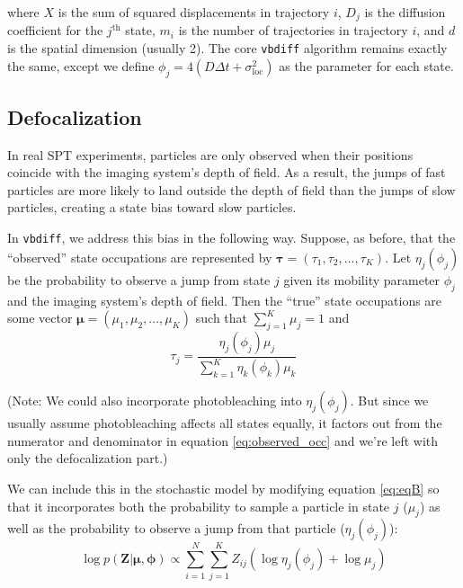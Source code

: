 \documentclass{article}
\let\vec\boldsymbol
\begin{document}
where $X$ is the sum of squared displacements in trajectory $i$,
$D_{j}$ is the diffusion coefficient for the $j^{\text{th}}$ state,
$m_{i}$ is the number of trajectories in trajectory $i$, and $d$
is the spatial dimension (usually 2). The core \verb|vbdiff| algorithm
remains exactly the same, except we define
$\phi_{j} = 4 (D \Delta t + \sigma_{\text{loc}}^{2})$ as the parameter
for each state.

\subsection{Defocalization}

In real SPT experiments, particles are only observed when their
positions coincide with the imaging system's depth of field.
As a result, the jumps of fast particles are more likely to land outside
the depth of field than the jumps of slow particles, creating a state
bias toward slow particles. \newline

In \verb|vbdiff|, we address this bias in the following way.
Suppose, as before, that the ``observed'' state occupations
are represented by $\boldsymbol{\tau} = (\tau_{1}, \tau_{2}, ..., \tau_{K})$.
Let $\eta_{j}(\phi_{j})$ be the probability to observe a jump from state $j$ given its mobility parameter $\phi_{j}$ and the imaging system's depth of field.
Then the ``true'' state occupations are some vector
$\boldsymbol{\mu} = (\mu_{1}, \mu_{2}, ..., \mu_{K})$ such that
$\sum_{j=1}^{K} \mu_{j} = 1$ and
\begin{equation}\label{eq:observed_occ}
    \tau_{j} = \frac{ \eta_{j} (\phi_{j}) \mu_{j} }{ \sum\limits_{k=1}^{K} \eta_{k} (\phi_{k}) \mu_{k} }
\end{equation}

(Note: We could also incorporate photobleaching into $\eta_{j} (\phi_{j})$. But
since we usually assume photobleaching affects all states equally,
it factors out from the numerator and denominator in equation
\ref{eq:observed_occ} and we're left with only the defocalization part.) \newline

We can include this in the stochastic model by modifying
equation \ref{eq:eqB} so that it incorporates both the
probability to sample a particle in state $j$ ($\mu_{j}$)
as well as the probability to observe a jump from that
particle ($\eta_{j}(\phi_{j})$):
\[
    \log p \left( \vec{Z} | \boldsymbol{\mu}, \boldsymbol{\phi} \right) \propto \sum\limits_{i=1}^{N} \sum\limits_{j=1}^{K} Z_{ij} \left(
        \log \eta_{j} (\phi_{j}) + \log \mu_{j}
    \right)
\]
\end{document}

